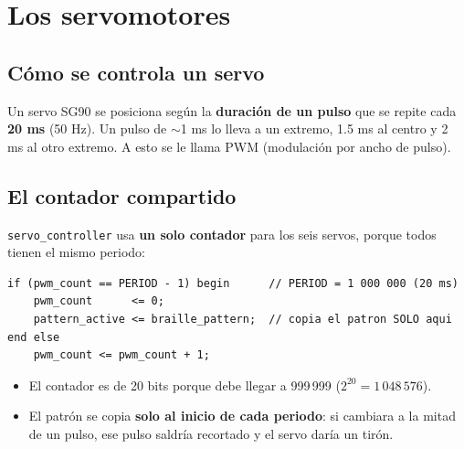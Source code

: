 \documentclass[11pt,a4paper]{article}
\newcommand{\cod}[1]{\texttt{#1}}
\begin{document}
\section{Los servomotores}\label{sec:servos}

\subsection{Cómo se controla un servo}
Un servo SG90 se posiciona según la \textbf{duración de un pulso} que se repite cada
\textbf{20 ms} (50 Hz). Un pulso de $\sim$1 ms lo lleva a un extremo, 1.5 ms al centro
y 2 ms al otro extremo. A esto se le llama PWM (modulación por ancho de pulso).

\begin{center}
\end{center}

\subsection{El contador compartido}
\cod{servo\_controller} usa \textbf{un solo contador} para los seis servos, porque
todos tienen el mismo periodo:
\begin{lstlisting}
if (pwm_count == PERIOD - 1) begin      // PERIOD = 1 000 000 (20 ms)
    pwm_count      <= 0;
    pattern_active <= braille_pattern;  // copia el patron SOLO aqui
end else
    pwm_count <= pwm_count + 1;
\end{lstlisting}
\begin{itemize}
  \item El contador es de 20 bits porque debe llegar a 999\,999 ($2^{20} = 1\,048\,576$).
  \item El patrón se copia \textbf{solo al inicio de cada periodo}: si cambiara a la
        mitad de un pulso, ese pulso saldría recortado y el servo daría un tirón.
\end{itemize}
\end{document}

